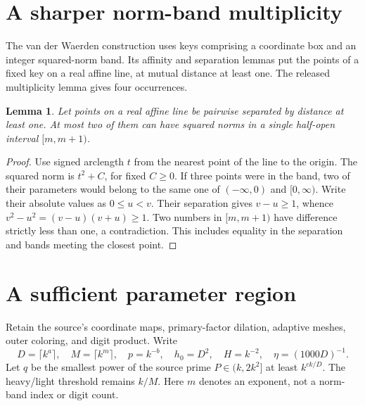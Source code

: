 \documentclass[11pt]{article}
\newtheorem{lemma}{Lemma}
\begin{document}
\section{A sharper norm-band multiplicity}
The van der Waerden construction uses keys comprising a coordinate box
and an integer squared-norm band. Its affinity and separation lemmas put
the points of a fixed key on a real affine line, at mutual distance at
least one. The released multiplicity lemma gives four occurrences.

\begin{lemma}\label{lem:band}
Let points on a real affine line be pairwise separated by distance at
least one. At most two of them can have squared norms in a single
half-open interval $[m,m+1)$.
\end{lemma}
\begin{proof}
Use signed arclength $t$ from the nearest point of the line to the origin.
The squared norm is $t^2+C$, for fixed $C\ge0$. If three points were
in the band, two of their parameters would belong to the same one of
$(-\infty,0)$ and $[0,\infty)$. Write their absolute values as
$0\le u<v$. Their separation gives $v-u\ge1$, whence
$v^2-u^2=(v-u)(v+u)\ge1$. Two numbers in $[m,m+1)$ have difference
strictly less than one, a contradiction. This includes equality in the
separation and bands meeting the closest point.
\end{proof}

\section{A sufficient parameter region}
Retain the source's coordinate maps, primary-factor dilation, adaptive
meshes, outer coloring, and digit product. Write
\[
 D=\lceil k^a\rceil,\quad M=\lceil k^m\rceil,\quad
 p=k^{-b},\quad h_0=D^2,\quad H=k^{-2},\quad
 \eta=(1000D)^{-1}.
\]
Let $q$ be the smallest power of the source prime $P\in(k,2k^2]$
at least $k^{ck/D}$. The heavy/light threshold remains $k/M$.
Here $m$ denotes an exponent, not a norm-band index or digit count.
\end{document}
